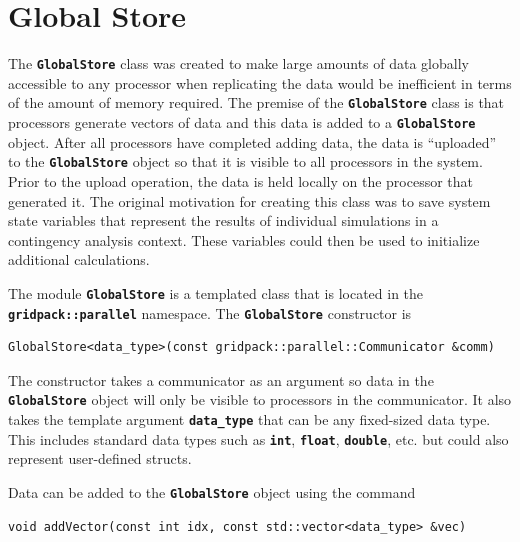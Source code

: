 \section{Global Store}\label{global_store}

The \texttt{\textbf{GlobalStore}} class was created to make large amounts of data globally accessible to any processor when replicating the data would be inefficient in terms of the amount of memory required. The premise of the \texttt{\textbf{GlobalStore}} class is that processors generate vectors of data and this data is added to a \texttt{\textbf{GlobalStore}} object. After all processors have completed adding data, the data is ``uploaded'' to the \texttt{\textbf{GlobalStore}} object so that it is visible to all processors in the system. Prior to the upload operation, the data is held locally on the processor that generated it. The original motivation for creating this class was to save system state variables that represent the results of individual simulations in a contingency analysis context. These variables could then be used to initialize additional calculations.

The module \texttt{\textbf{GlobalStore}} is a templated class that is located in the \texttt{\textbf{gridpack::parallel}} namespace. The \texttt{\textbf{GlobalStore}} constructor is

{
\color{red}
\begin{Verbatim}[fontseries=b]
GlobalStore<data_type>(const gridpack::parallel::Communicator &comm)
\end{Verbatim}
}

The constructor takes a communicator as an argument so data in the \texttt{\textbf{GlobalStore}} object will only be visible to processors in the communicator. It also takes the template argument \texttt{\textbf{data\_type}} that can be any fixed-sized data type. This includes standard data types such as \texttt{\textbf{int}}, \texttt{\textbf{float}}, \texttt{\textbf{double}}, etc. but could also represent user-defined structs.

Data can be added to the \texttt{\textbf{GlobalStore}} object using the command

{
\color{red}
\begin{Verbatim}[fontseries=b]
void addVector(const int idx, const std::vector<data_type> &vec)
\end{Verbatim}
}

